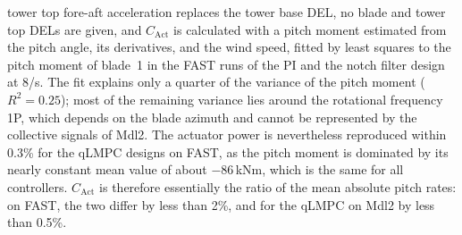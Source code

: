 
tower top fore-aft acceleration replaces the tower base DEL, no blade and tower top DELs are given, and $C_\text{Act}$ is calculated with a pitch moment estimated from the pitch angle, its derivatives, and the wind
speed, fitted by least squares to the pitch moment of blade~1 in the FAST runs of the PI and the notch filter design at
8\textdegree/s. The fit explains only a quarter of the variance of the pitch moment ($R^2 = 0.25$); most of the
remaining variance lies around the rotational frequency 1P, which depends on the blade azimuth and cannot be
represented by the collective signals of Mdl2. The actuator power is nevertheless reproduced within 0.3\% for the
qLMPC designs on FAST, as the pitch moment is dominated by its nearly constant mean value of about $-86$\,kNm,
which is the same for all controllers. $C_\text{Act}$ is therefore essentially the ratio of the mean absolute
pitch rates: on FAST, the two differ by less than 2\%, and for the qLMPC on Mdl2 by less than 0.5\%.
